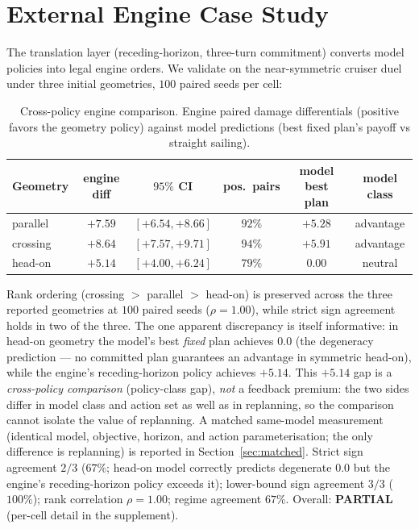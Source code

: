 \documentclass[12pt,a4paper]{article}
\begin{document}
\section{External Engine Case Study}\label{sec:validation}

The translation layer (receding-horizon, three-turn commitment) converts
model policies into legal engine orders.  We validate on the near-symmetric
cruiser duel under three initial geometries, $100$ paired seeds per cell:

\begin{table}[!htb]
\centering\small
\caption{Cross-policy engine comparison.  Engine paired damage differentials
(positive favors the geometry policy) against model predictions (best
fixed plan's payoff vs straight sailing).}
\label{tab:b13}
\begin{tabular}{lccccc}
\toprule
Geometry & engine diff & $95\%$ CI & pos.\ pairs & model best plan & model class \\
\midrule
parallel & $+7.59$ & $[+6.54,+8.66]$ & $92\%$ & $+5.28$ & advantage \\
crossing & $+8.64$ & $[+7.57,+9.71]$ & $94\%$ & $+5.91$ & advantage \\
head-on & $+5.14$ & $[+4.00,+6.24]$ & $79\%$ & $0.00$ & neutral \\
\bottomrule
\end{tabular}
\end{table}

Rank ordering (crossing $>$ parallel $>$ head-on) is preserved across the
three reported geometries at $100$ paired seeds ($\rho=1.00$), while strict
sign agreement holds in two of the three.  The one apparent discrepancy is itself
informative: in head-on geometry the model's best \emph{fixed} plan
achieves $0.0$ (the degeneracy prediction --- no committed plan guarantees
an advantage in symmetric head-on), while the engine's receding-horizon
policy achieves $+5.14$.  This $+5.14$ gap is a \emph{cross-policy
comparison} (policy-class gap), \emph{not} a feedback premium: the two
sides differ in model class and action set as well as in replanning, so
the comparison cannot isolate the value of replanning.  A matched
same-model measurement (identical model, objective, horizon, and action
parameterisation; the only difference is replanning) is reported in
Section~\ref{sec:matched}.
Strict sign agreement $2/3$ ($67\%$; head-on model correctly predicts
degenerate $0.0$ but the engine's receding-horizon policy exceeds it);
lower-bound sign agreement $3/3$ ($100\%$); rank correlation $\rho=1.00$;
regime agreement $67\%$.  Overall: \textbf{PARTIAL} (per-cell detail in
the supplement).
\end{document}
